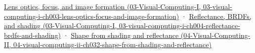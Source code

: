 \href{../03-Visual-Computing-I/main.pdf\#nameddest=03-visual-computing-i-ch003-lens-optics-focus-and-image-formation}{Lens optics, focus, and image formation (03-Visual-Computing-I, 03-visual-computing-i-ch003-lens-optics-focus-and-image-formation)} · \href{../03-Visual-Computing-I/main.pdf\#nameddest=03-visual-computing-i-ch004-reflectance-brdfs-and-shading}{Reflectance, BRDFs, and shading (03-Visual-Computing-I, 03-visual-computing-i-ch004-reflectance-brdfs-and-shading)} · \href{../04-Visual-Computing-II/main.pdf\#nameddest=04-visual-computing-ii-ch032-shape-from-shading-and-reflectance}{Shape from shading and reflectance (04-Visual-Computing-II, 04-visual-computing-ii-ch032-shape-from-shading-and-reflectance)}
